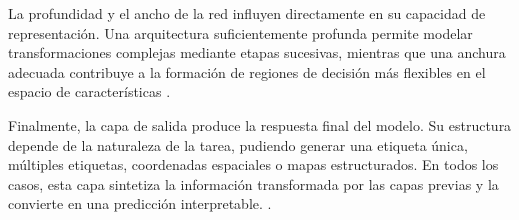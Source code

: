 La profundidad y el ancho de la red influyen directamente en su capacidad de representación. Una arquitectura suficientemente profunda permite modelar transformaciones complejas mediante etapas sucesivas, mientras que una anchura adecuada contribuye a la formación de regiones de decisión más flexibles en el espacio de características \parencite{chaturvedi2023activation}.

Finalmente, la capa de salida produce la respuesta final del modelo. Su estructura depende de la naturaleza de la tarea, pudiendo generar una etiqueta única, múltiples etiquetas, coordenadas espaciales o mapas estructurados. En todos los casos, esta capa sintetiza la información transformada por las capas previas y la convierte en una predicción interpretable. \parencite{liu2024binary}. \\

